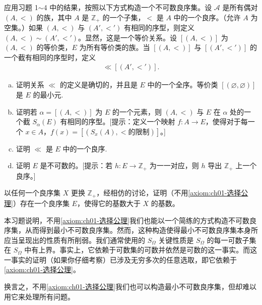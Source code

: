 \documentclass[../../main.tex]{subfiles}
\begin{document}
\begin{exercise}\label{exercise:ch01-附加良序-8}
应用习题 1$\sim$4 中的结果，按照以下方式构造一个不可数良序集。设 $\mathcal{A}$ 是所有偶对 $(A, <)$ 的族，其中 $A$ 是 $\mathbb{Z}_{+}$ 的一个子集，$<$ 是 $A$ 中的一个良序。（允许 $A$ 为空集。）如果 $(A, <)$ 与 $(A', <')$ 有相同的序型，则定义 $(A, <) \sim (A', <')$。显然，这是一个等价关系。设 $[(A, <)]$ 为 $(A, <)$ 的等价类，$E$ 为所有等价类的族。当 $[(A, <)]$ 与 $[(A', <')]$ 的一个截有相同的序型时，定义
\begin{align*}
[(A, <)] \ll [(A', <')].
\end{align*}
\begin{enumerate}[(a)]
\item 证明关系 $\ll$ 的定义是确切的，并且是 $E$ 中的一个全序。等价类 $[(\varnothing, \varnothing)]$ 是 $E$ 的最小元.
\item 证明若 $\alpha = [(A, <)]$ 为 $E$ 的一个元素，则 $(A, <)$ 与 $E$ 在 $\alpha$ 处的一个截 $S_{\alpha}(E)$ 有相同的序型。[提示：定义一个映射 $f: A \longrightarrow E$，使得对于每一个 $x \in A$，$f(x) = [(S_{x}(A), <\text{的限制})]$。]
\item 证明 $\ll$ 是 $E$ 中的一个良序.
\item 证明 $E$ 是不可数的。[提示：若 $h: E \longrightarrow \mathbb{Z}_{+}$ 为一一对应，则 $h$ 导出 $\mathbb{Z}_{+}$ 上一个良序。]
\end{enumerate}
以任何一个良序集 $X$ 更换 $\mathbb{Z}_{+}$，经相仿的讨论，证明（不用\cref{axiom:ch01-选择公理}）存在一个良序集 $E$，使得它的基数大于 $X$ 的基数。

本习题说明，不用\cref{axiom:ch01-选择公理}我们也能以一个简练的方式构造不可数良序集，从而得到最小不可数良序集。然而，这种构造使得最小不可数良序集本身所应当呈现出的性质有所削弱。我们通常使用的 $S_{\Omega}$ 关键性质是 $S_{\Omega}$ 的每一可数子集在 $S_{\Omega}$ 中有上界。事实上，它依赖于可数集的可数并依然是可数的这一事实。而这一事实的证明（如果你仔细考察）已涉及无穷多次的任意选取，即它依赖于\cref{axiom:ch01-选择公理}。

换言之，不用\cref{axiom:ch01-选择公理}我们也可以构造最小不可数良序集，但却难以用它来处理所有问题。
\end{exercise}
\end{document}
